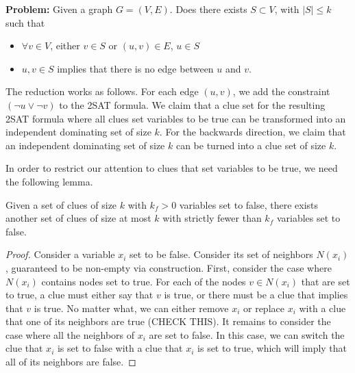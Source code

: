 \documentclass[runningheads,a4paper]{llncs}
\begin{document}
\noindent\textbf{Problem:} Given a graph $G = (V, E)$. Does there exists $S \subset V$, with $|S| \leq k$ such that 
\begin{itemize}
\item $\forall v \in V$, either $v \in S$ or $(u, v) \in E$, $u \in S$ 
\item $u, v \in S$ implies that there is no edge between $u$ and $v$. 
\end{itemize}

The reduction works as follows. For each edge $(u,v)$, we add the constraint $(\neg u \vee \neg v)$ to the 2SAT formula. We claim that a clue set for the resulting 2SAT formula where all clues set variables to be true can be transformed into an independent dominating set of size $k$. For the backwards direction, we claim that an independent dominating set of size $k$ can be turned into a clue set of size $k$. 

%

In order to restrict our attention to clues that set variables to be true, we need the following lemma.

\begin{lemma} Given a set of clues of size $k$ with $k_f > 0$ variables set to false, there exists another set of clues of size at most $k$ with strictly fewer than $k_f$ variables set to false.
\end{lemma}

\begin{proof} 
Consider a variable $x_i$ set to be false. Consider its set of neighbors $N(x_i)$, guaranteed to be non-empty via construction. First, consider the case where $N(x_i)$ contains nodes set to true. For each of the nodes $v \in N(x_i)$ that are set to true, a clue must either say that $v$ is true, or there must be a clue that implies that $v$ is true. No matter what, we can either remove $x_i$ or replace $x_i$ with a clue that one of its neighbors are true (CHECK THIS). It remains to consider the case where all the neighbors of $x_i$ are set to false. In this case, we can switch the clue that $x_i$ is set to false with a clue that $x_i$ is set to true, which will imply that all of its neighbors are false.
\end{proof}
\end{document}
